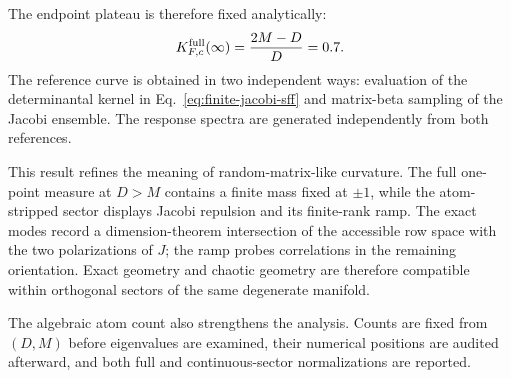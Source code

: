 The endpoint plateau is therefore fixed analytically:
\begin{equation}
 K_{F,c}^{\rm full}(\infty)
 =\frac{2M-D}{D}
 =0.7 .
 \label{eq:endpoint-plateau}
\end{equation}
The reference curve is obtained in two independent ways: evaluation of the
determinantal kernel in Eq.~\eqref{eq:finite-jacobi-sff} and matrix-beta
sampling of the Jacobi ensemble.
The response spectra are generated independently from both references.

This result refines the meaning of random-matrix-like curvature.
The full one-point measure at \(D>M\) contains a finite mass fixed at
\(\pm1\), while the atom-stripped sector displays Jacobi repulsion and its
finite-rank ramp.
The exact modes record a dimension-theorem intersection of the accessible row
space with the two polarizations of \(J\); the ramp probes correlations in the
remaining orientation.
Exact geometry and chaotic geometry are therefore compatible within
orthogonal sectors of the same degenerate manifold.

The algebraic atom count also strengthens the analysis.  Counts are fixed from
\((D,M)\) before eigenvalues are examined, their numerical positions are
audited afterward, and both full and continuous-sector normalizations are
reported.
